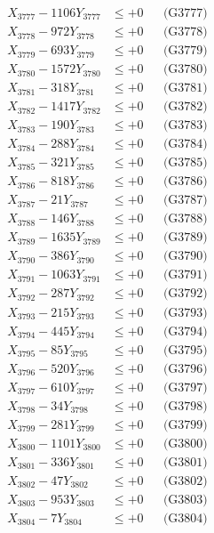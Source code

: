 \documentclass[a4paper,10pt]{article}
\begin{document}
{\begin{align}
X_{3777} - 1106Y_{3777} &\leq +0 && \text{(G3777)} \\
X_{3778} - 972Y_{3778} &\leq +0 && \text{(G3778)} \\
X_{3779} - 693Y_{3779} &\leq +0 && \text{(G3779)} \\
X_{3780} - 1572Y_{3780} &\leq +0 && \text{(G3780)} \\
\allowbreak
X_{3781} - 318Y_{3781} &\leq +0 && \text{(G3781)} \\
X_{3782} - 1417Y_{3782} &\leq +0 && \text{(G3782)} \\
X_{3783} - 190Y_{3783} &\leq +0 && \text{(G3783)} \\
X_{3784} - 288Y_{3784} &\leq +0 && \text{(G3784)} \\
X_{3785} - 321Y_{3785} &\leq +0 && \text{(G3785)} \\
X_{3786} - 818Y_{3786} &\leq +0 && \text{(G3786)} \\
X_{3787} - 21Y_{3787} &\leq +0 && \text{(G3787)} \\
X_{3788} - 146Y_{3788} &\leq +0 && \text{(G3788)} \\
X_{3789} - 1635Y_{3789} &\leq +0 && \text{(G3789)} \\
X_{3790} - 386Y_{3790} &\leq +0 && \text{(G3790)} \\
\allowbreak
X_{3791} - 1063Y_{3791} &\leq +0 && \text{(G3791)} \\
X_{3792} - 287Y_{3792} &\leq +0 && \text{(G3792)} \\
X_{3793} - 215Y_{3793} &\leq +0 && \text{(G3793)} \\
X_{3794} - 445Y_{3794} &\leq +0 && \text{(G3794)} \\
X_{3795} - 85Y_{3795} &\leq +0 && \text{(G3795)} \\
X_{3796} - 520Y_{3796} &\leq +0 && \text{(G3796)} \\
X_{3797} - 610Y_{3797} &\leq +0 && \text{(G3797)} \\
X_{3798} - 34Y_{3798} &\leq +0 && \text{(G3798)} \\
X_{3799} - 281Y_{3799} &\leq +0 && \text{(G3799)} \\
X_{3800} - 1101Y_{3800} &\leq +0 && \text{(G3800)} \\
\allowbreak
X_{3801} - 336Y_{3801} &\leq +0 && \text{(G3801)} \\
X_{3802} - 47Y_{3802} &\leq +0 && \text{(G3802)} \\
X_{3803} - 953Y_{3803} &\leq +0 && \text{(G3803)} \\
X_{3804} - 7Y_{3804} &\leq +0 && \text{(G3804)} \\

\end{align}}
\end{document}

